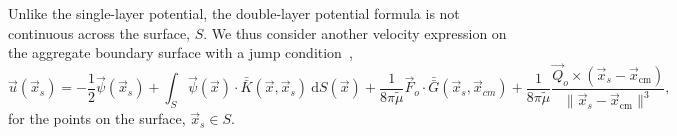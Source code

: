 \par
Unlike the single-layer potential, the double-layer potential formula is not continuous across the surface, $S$.
We thus consider another velocity expression on the aggregate boundary surface with a jump condition~\cite{pozrikidis_boundary_1992},
\begin{equation}
\vec{u}(\vec{x}_s) = -\frac{1}{2} \vec{\psi}(\vec{x}_s) 
+\int_S  \vec{\psi}(\vec{x})  \cdot \bar{\bar{K}} (\vec{x},\vec{x}_s) \ \text{d}S(\vec{x}) 
+\frac{1}{8 \pi \tilde{\mu} } \vec{F}_o \cdot \bar{\bar{G}}(\vec{x}_{s},\vec{x}_{cm})
+\frac{1}{8 \pi \tilde{\mu} } \frac{\vec{Q}_o \times  (\vec{x}_s   - \vec{x}_{\text{cm}} ) }{\| \vec{x}_s  - \vec{x}_{\text{cm}} \|^3 },
\label{eq_BI_DL_on}
\end{equation}
for the points on the surface, $\vec{x}_s \in S$.
